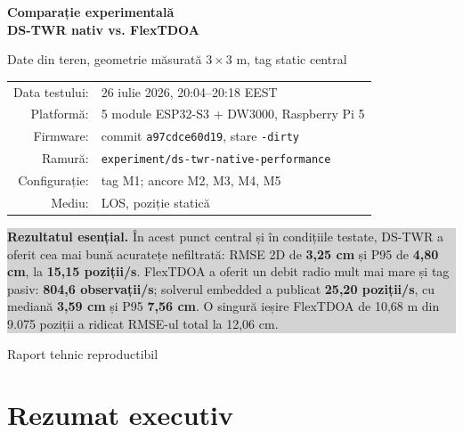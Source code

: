 \documentclass[11pt,a4paper]{article}
\newcommand{\dstwr}{\textcolor{dsblue}{DS-TWR}}
\newcommand{\flextdoa}{\textcolor{flexorange}{FlexTDOA}}
\begin{document}

\begin{titlepage}
  \centering
  \vspace*{17mm}
  {\Huge\bfseries Comparație experimentală\\[3mm]
  \dstwr{} nativ vs. \flextdoa\par}
  \vspace{7mm}
  {\Large Date din teren, geometrie măsurată $3\times3$ m, tag static central\par}
  \vspace{18mm}

  \begin{tabular}{rl}
    Data testului: & 26 iulie 2026, 20:04--20:18 EEST\\
    Platformă: & 5 module ESP32-S3 + DW3000, Raspberry Pi 5\\
    Firmware: & commit \texttt{a97cdce60d19}, stare \texttt{-dirty}\\
    Ramură: & \texttt{experiment/ds-twr-native-performance}\\
    Configurație: & tag M1; ancore M2, M3, M4, M5\\
    Mediu: & LOS, poziție statică\\
  \end{tabular}

  \vfill
  \colorbox{lightgray}{%
    \begin{minipage}{0.88\textwidth}
      \vspace{3mm}
      \textbf{Rezultatul esențial.}
      În acest punct central și în condițiile testate, DS-TWR a oferit cea mai
      bună acuratețe nefiltrată: RMSE 2D de \textbf{3,25 cm} și P95 de
      \textbf{4,80 cm}, la \textbf{15,15 poziții/s}. FlexTDOA a oferit un debit
      radio mult mai mare și tag pasiv: \textbf{804,6 observații/s}; solverul
      embedded a publicat \textbf{25,20 poziții/s}, cu mediană
      \textbf{3,59 cm} și P95 \textbf{7,56 cm}. O singură ieșire FlexTDOA de
      10,68 m din 9.075 poziții a ridicat RMSE-ul total la 12,06 cm.
      \vspace{3mm}
    \end{minipage}}
  \vfill
  {\large Raport tehnic reproductibil\par}
  \vspace{5mm}
\end{titlepage}

\tableofcontents
\clearpage
{}

\section{Rezumat executiv}
\end{document}
